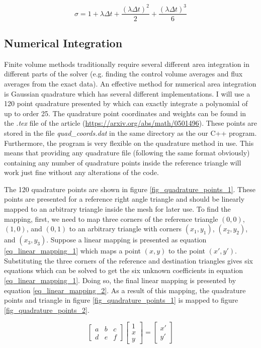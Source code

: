 \documentclass{article}
\begin{document}
\begin{equation}
\label{eq_rk3_2}
\sigma = 1+ \lambda \Delta t +\dfrac{(\lambda \Delta t)^2}{2}+\dfrac{(\lambda \Delta t)^3}{6}
\end{equation}


\subsection{Numerical Integration}
Finite volume methods traditionally require several different area integration in different parts of the solver (e.g. finding the control volume averages and flux averages from the exact data). An effective method for numerical area integration is Gaussian quadrature which has several different implementations. I will use a 120 point quadrature presented by \cite{taylor2005new} which can exactly integrate a polynomial of up to order 25. The quadrature point coordinates and weights can be found in the \textit{.tex} file of the article (\href{https://arxiv.org/abs/math/0501496}{https://arxiv.org/abs/math/0501496}). These points are stored in the file \textit{quad\_coords.dat} in the same directory as the our C++ program. Furthermore, the program is very flexible on the quadrature method in use. This means that providing any quadrature file (following the same format obviously) containing any number of quadrature points inside the reference triangle will work just fine without any alterations of the code.

The 120 quadrature points are shown in figure \ref{fig_quadrature_points_1}. These points are presented for a reference right angle triangle and should be linearly mapped to an arbitrary triangle inside the mesh for later use. To find the mapping, first, we need to map three corners of the reference triangle $(0,0)$, $(1,0)$, and $(0,1)$ to an arbitrary triangle with corners $(x_1,y_1)$, $(x_2,y_2)$, and $(x_3,y_3)$. Suppose a linear  mapping is presented as equation \ref{eq_linear_mapping_1} which maps a point $(x,y)$ to the point $(x',y')$. Substituting the three corners of the reference and destination triangles gives six equations which can be solved to get the six unknown coefficients in equation \ref{eq_linear_mapping_1}. Doing so, the final linear mapping is presented by equation \ref{eq_linear_mapping_2}. As a result of this mapping, the quadrature points and triangle in figure \ref{fig_quadrature_points_1} is mapped to figure \ref{fig_quadrature_points_2}.

\begin{equation}
\label{eq_linear_mapping_1}
\left[
\begin{matrix}
a & b & c \\
d & e & f
\end{matrix}
\right]\left[
\begin{matrix}
1 \\
x \\
y
\end{matrix}
\right]=\left[
\begin{matrix}
x' \\
y'
\end{matrix}
\right]
\end{equation}
\end{document}
